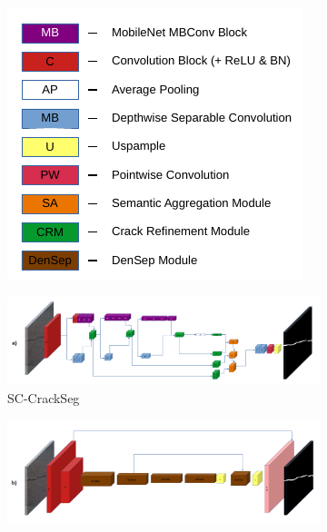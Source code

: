 \documentclass[a4paper,12pt]{report}
\begin{document}
\begin{figure}[]
    \centering
    \begin{subfigure}[b]{0.3\textwidth}
        \centering
        \includegraphics[width=\textwidth]{res/crack-experiment-diagrams/legend.pdf}
        \label{fig:sc-crackseg-versions-legend}
    \end{subfigure}
    \begin{subfigure}[b]{0.6964\textwidth}
        \centering
        \includegraphics[width=\textwidth]{res/crack-experiment-diagrams/sc-crackseg.pdf}
        \caption{SC-CrackSeg}
        \label{fig:sc-crackseg-versions-sc-crackseg}
    \end{subfigure}
    \begin{subfigure}[b]{0.6964\textwidth}
        \centering
        \includegraphics[width=\textwidth]{res/crack-experiment-diagrams/sddnet.pdf}

\end{subfigure}
\end{figure}
\end{document}
